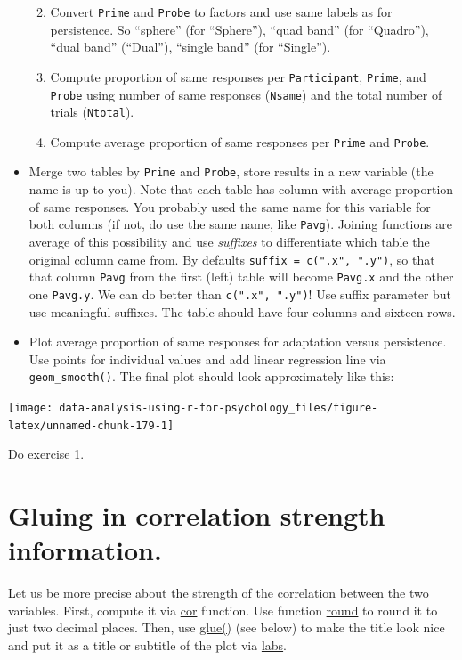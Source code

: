 \documentclass[
]{book}
\providecommand{\tightlist}{%
  \setlength{\itemsep}{0pt}\setlength{\parskip}{0pt}}
\begin{document}
\begin{itemize}
  \begin{enumerate}
  \def\labelenumi{\arabic{enumi}.}
  \tightlist
  \item
    Convert \texttt{Prime} and \texttt{Probe} to factors and use same labels as for persistence. So ``sphere'' (for ``Sphere''), ``quad band'' (for ``Quadro''), ``dual band'' (``Dual''), ``single band'' (for ``Single'').
  \item
    Compute proportion of same responses per \texttt{Participant}, \texttt{Prime}, and \texttt{Probe} using number of same responses (\texttt{Nsame}) and the total number of trials (\texttt{Ntotal}).
  \item
    Compute average proportion of same responses per \texttt{Prime} and \texttt{Probe}.
  \end{enumerate}
\item
  Merge two tables by \texttt{Prime} and \texttt{Probe}, store results in a new variable (the name is up to you). Note that each table has column with average proportion of same responses. You probably used the same name for this variable for both columns (if not, do use the same name, like \texttt{Pavg}). Joining functions are average of this possibility and use \emph{suffixes} to differentiate which table the original column came from. By defaults \texttt{suffix\ =\ c(".x",\ ".y")}, so that that column \texttt{Pavg} from the first (left) table will become \texttt{Pavg.x} and the other one \texttt{Pavg.y}. We can do better than \texttt{c(".x",\ ".y")}! Use suffix parameter but use meaningful suffixes. The table should have four columns and sixteen rows.
\item
  Plot average proportion of same responses for adaptation versus persistence. Use points for individual values and add linear regression line via \texttt{geom\_smooth()}. The final plot should look approximately like this:
\end{itemize}

\begin{center}\texttt{[image: data-analysis-using-r-for-psychology\_files/figure-latex/unnamed-chunk-179-1]} \end{center}

Do exercise 1.

\hypertarget{glue}{%
\section{Gluing in correlation strength information.}\label{glue}}

Let us be more precise about the strength of the correlation between the two variables. First, compute it via \href{https://stat.ethz.ch/R-manual/R-patched/library/stats/html/cor.html}{cor} function. Use function \href{https://stat.ethz.ch/R-manual/R-patched/library/base/html/Round.html}{round} to round it to just two decimal places. Then, use \href{https://glue.tidyverse.org/}{glue()} (see below) to make the title look nice and put it as a title or subtitle of the plot via \href{https://ggplot2.tidyverse.org/reference/labs.html}{labs}.
\end{document}
